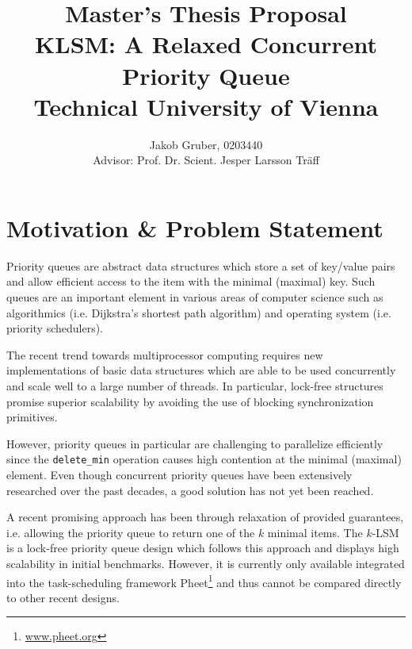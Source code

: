\documentclass[a4paper,10pt]{article}
\title{Master's Thesis Proposal \\
       KLSM: A Relaxed Concurrent Priority Queue \\
       Technical University of Vienna}
\author{Jakob Gruber, 0203440 \\
        Advisor: Prof. Dr. Scient. Jesper Larsson Tr\"aff}
\begin{document}
\maketitle

\begin{comment}
http://www.informatik.tuwien.ac.at/dekanat/abschluss-master

Der Anmeldung der Diplomarbeit ist ein Abstract beizufügen. Das Abstract muss strukturiert in
i) Problemstellung,
ii) erwartetes Resultat,
iii) methodisches Vorgehen,
iv) State-of-the art (inkl. mind. vier Literaturreferenzen) sowie
v) Bezug zum angeführten Studium
abgefasst werden.

Bsp 1: http://www.informatik.tuwien.ac.at/dekanat/Abstract1.pdf
Bsp 2: http://www.informatik.tuwien.ac.at/dekanat/Abstract2.pdf
\end{comment}

\section{Motivation \& Problem Statement}

Priority queues are abstract data structures which store a set of key/value pairs
and allow efficient access to the item with the minimal (maximal) key. Such queues are an important
element in various areas of computer science such as algorithmics (i.e. Dijkstra's shortest
path algorithm) and operating system (i.e. priority schedulers).

The recent trend towards multiprocessor computing requires new implementations of basic
data structures which are able to be used concurrently and scale well to a large number
of threads. In particular, lock-free structures promise superior scalability by avoiding
the use of blocking synchronization primitives.

However, priority queues in particular are challenging to parallelize efficiently since
the \lstinline|delete_min| operation causes high contention at the minimal (maximal) element.
Even though concurrent priority queues have been extensively researched over the past decades,
a good solution has not yet been reached.

A recent promising approach has been through relaxation of provided guarantees, i.e.
allowing the priority queue to return one of the $k$ minimal items. The $k$-LSM is a lock-free
priority queue design which follows this approach and displays high scalability in initial
benchmarks. However, it is currently only available integrated into the task-scheduling framework
Pheet\footnote{\url{www.pheet.org}} and thus cannot be compared directly to other recent designs.
\end{document}
